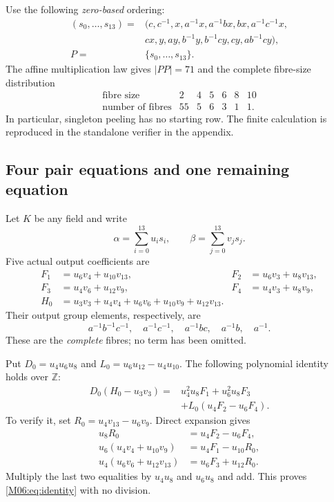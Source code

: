 \documentclass[11pt,a4paper,oneside]{report}
\theoremstyle{definition}
\theoremstyle{remark}
\newcommand{\Z}{\mathbb Z}
\begin{document}
Use the following \emph{zero-based} ordering:
\begin{equation}\label{M06:eq:P}
\begin{split}
(s_0,\ldots,s_{13})={}&(c,c^{-1},x,a^{-1}x,a^{-1}bx,bx,a^{-1}c^{-1}x,\\
&cx,y,ay,b^{-1}y,b^{-1}cy,cy,ab^{-1}cy),\\
P={}&\{s_0,\ldots,s_{13}\}.
\end{split}
\end{equation}
The affine multiplication law gives $|PP|=71$ and the complete
fibre-size distribution
\[
\begin{array}{c|rrrrrr}
\text{fibre size}&2&4&5&6&8&10\\\hline
\text{number of fibres}&55&5&6&3&1&1.
\end{array}
\]
In particular, singleton peeling has no starting row.
The finite calculation is reproduced in the standalone verifier
in the appendix.

\subsection{Four pair equations and one remaining equation}

Let $K$ be any field and write
\[
\alpha=\sum_{i=0}^{13}u_i s_i,\qquad
\beta=\sum_{j=0}^{13}v_j s_j.
\]
Five actual output coefficients are
\begin{align*}
F_1&=u_6v_4+u_{10}v_{13},&
F_2&=u_6v_3+u_8v_{13},\\
F_3&=u_4v_6+u_{12}v_9,&
F_4&=u_4v_3+u_8v_9,\\
H_0&=u_3v_3+u_4v_4+u_6v_6+u_{10}v_9+u_{12}v_{13}.
\end{align*}
Their output group elements, respectively, are
\[
a^{-1}b^{-1}c^{-1},\quad a^{-1}c^{-1},\quad
a^{-1}bc,\quad a^{-1}b,\quad a^{-1}.
\]
These are the \emph{complete} fibres; no term has been omitted.

Put $D_0=u_4u_6u_8$ and $L_0=u_6u_{12}-u_4u_{10}$.
The following polynomial identity holds over $\Z$:
\begin{equation}\label{M06:eq:identity}
\boxed{\begin{aligned}
D_0(H_0-u_3v_3)
={}&u_4^2u_8F_1+u_6^2u_8F_3\\
&+L_0(u_4F_2-u_6F_4).
\end{aligned}}
\end{equation}
To verify it, set $R_0=u_4v_{13}-u_6v_9$. Direct expansion gives
\[
\begin{aligned}
u_8R_0&=u_4F_2-u_6F_4,\\
u_6(u_4v_4+u_{10}v_9)&=u_4F_1-u_{10}R_0,\\
u_4(u_6v_6+u_{12}v_{13})&=u_6F_3+u_{12}R_0.
\end{aligned}
\]
Multiply the last two equalities by $u_4u_8$ and $u_6u_8$
and add. This proves \eqref{M06:eq:identity} with no division.
\end{document}
